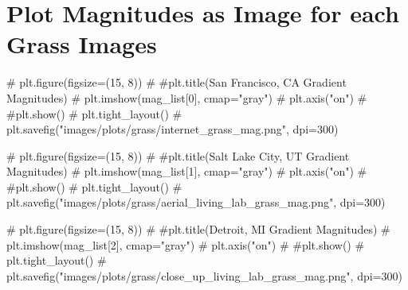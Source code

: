 \documentclass[
  letterpaper,
  DIV=11,
  numbers=noendperiod]{scrreprt}
\newenvironment{Shaded}{\begin{snugshade}}{\end{snugshade}}
\newcommand{\CommentTok}[1]{\textcolor[rgb]{0.37,0.37,0.37}{#1}}
\begin{document}
\section{Plot Magnitudes as Image for each Grass
Images}\label{plot-magnitudes-as-image-for-each-grass-images}

\begin{Shaded}
\begin{Highlighting}[]
\CommentTok{\# plt.figure(figsize=(15, 8))}
\CommentTok{\# \#plt.title(\textquotesingle{}San Francisco, CA Gradient Magnitudes\textquotesingle{})}
\CommentTok{\# plt.imshow(mag\_list[0], cmap="gray")}
\CommentTok{\# plt.axis("on")}
\CommentTok{\# \#plt.show()}
\CommentTok{\# plt.tight\_layout()}
\CommentTok{\# plt.savefig("images/plots/grass/internet\_grass\_mag.png", dpi=300)}
\end{Highlighting}
\end{Shaded}

\begin{Shaded}
\begin{Highlighting}[]
\CommentTok{\# plt.figure(figsize=(15, 8))}
\CommentTok{\# \#plt.title(\textquotesingle{}Salt Lake City, UT Gradient Magnitudes\textquotesingle{})}
\CommentTok{\# plt.imshow(mag\_list[1], cmap="gray")}
\CommentTok{\# plt.axis("on")}
\CommentTok{\# \#plt.show()}
\CommentTok{\# plt.tight\_layout()}
\CommentTok{\# plt.savefig("images/plots/grass/aerial\_living\_lab\_grass\_mag.png", dpi=300)}
\end{Highlighting}
\end{Shaded}

\begin{Shaded}
\begin{Highlighting}[]
\CommentTok{\# plt.figure(figsize=(15, 8))}
\CommentTok{\# \#plt.title(\textquotesingle{}Detroit, MI Gradient Magnitudes\textquotesingle{})}
\CommentTok{\# plt.imshow(mag\_list[2], cmap="gray")}
\CommentTok{\# plt.axis("on")}
\CommentTok{\# \#plt.show()}
\CommentTok{\# plt.tight\_layout()}
\CommentTok{\# plt.savefig("images/plots/grass/close\_up\_living\_lab\_grass\_mag.png", dpi=300)}
\end{Highlighting}
\end{Shaded}
\end{document}
